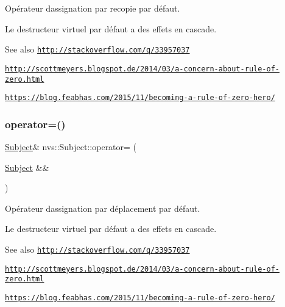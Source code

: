 Opérateur d\textquotesingle{}assignation par recopie par défaut. 

Le destructeur virtuel par défaut a des effets en cascade.

\begin{DoxySeeAlso}{See also}
\href{http://stackoverflow.com/q/33957037}{\tt http\+://stackoverflow.\+com/q/33957037} 

\href{http://scottmeyers.blogspot.de/2014/03/a-concern-about-rule-of-zero.html}{\tt http\+://scottmeyers.\+blogspot.\+de/2014/03/a-\/concern-\/about-\/rule-\/of-\/zero.\+html} 

\href{https://blog.feabhas.com/2015/11/becoming-a-rule-of-zero-hero/}{\tt https\+://blog.\+feabhas.\+com/2015/11/becoming-\/a-\/rule-\/of-\/zero-\/hero/} 
\end{DoxySeeAlso}
\mbox{\label{classnvs_1_1_subject_afa3849e579c73fc54258f2b5ddd8317e}} 
\subsubsection{\texorpdfstring{operator=()}{operator=()}\hspace{0.1cm}{\footnotesize\ttfamily [2/2]}}
{\footnotesize\ttfamily \mbox{\hyperlink{classnvs_1_1_subject}{Subject}}\& nvs\+::\+Subject\+::operator= (\begin{DoxyParamCaption}\item[{\mbox{\hyperlink{classnvs_1_1_subject}{Subject}} \&\&}]{ }\end{DoxyParamCaption})\hspace{0.3cm}{\ttfamily [default]}}



Opérateur d\textquotesingle{}assignation par déplacement par défaut. 

Le destructeur virtuel par défaut a des effets en cascade.

\begin{DoxySeeAlso}{See also}
\href{http://stackoverflow.com/q/33957037}{\tt http\+://stackoverflow.\+com/q/33957037} 

\href{http://scottmeyers.blogspot.de/2014/03/a-concern-about-rule-of-zero.html}{\tt http\+://scottmeyers.\+blogspot.\+de/2014/03/a-\/concern-\/about-\/rule-\/of-\/zero.\+html} 

\href{https://blog.feabhas.com/2015/11/becoming-a-rule-of-zero-hero/}{\tt https\+://blog.\+feabhas.\+com/2015/11/becoming-\/a-\/rule-\/of-\/zero-\/hero/} 
\end{DoxySeeAlso}
\mbox{\label{classnvs_1_1_subject_a4a476a25d1fa0db77f5ca86a6b0637f2}} 

